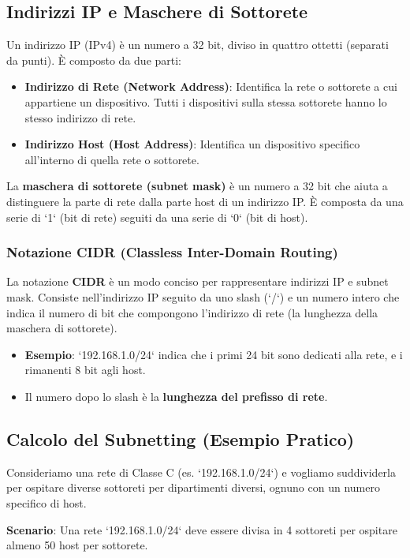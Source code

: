 \subsection{Indirizzi IP e Maschere di Sottorete}
Un indirizzo IP (IPv4) è un numero a 32 bit, diviso in quattro ottetti (separati da punti). È composto da due parti:
\begin{itemize}
    \item \textbf{Indirizzo di Rete (Network Address)}: Identifica la rete o sottorete a cui appartiene un dispositivo. Tutti i dispositivi sulla stessa sottorete hanno lo stesso indirizzo di rete.
    \item \textbf{Indirizzo Host (Host Address)}: Identifica un dispositivo specifico all'interno di quella rete o sottorete.
\end{itemize}
La \textbf{maschera di sottorete (subnet mask)} è un numero a 32 bit che aiuta a distinguere la parte di rete dalla parte host di un indirizzo IP. È composta da una serie di `1` (bit di rete) seguiti da una serie di `0` (bit di host).

\subsubsection{Notazione CIDR (Classless Inter-Domain Routing)}
La notazione \textbf{CIDR} è un modo conciso per rappresentare indirizzi IP e subnet mask. Consiste nell'indirizzo IP seguito da uno slash (`/`) e un numero intero che indica il numero di bit che compongono l'indirizzo di rete (la lunghezza della maschera di sottorete).
\begin{itemize}
    \item \textbf{Esempio}: `192.168.1.0/24` indica che i primi 24 bit sono dedicati alla rete, e i rimanenti 8 bit agli host.
    \item Il numero dopo lo slash è la \textbf{lunghezza del prefisso di rete}.
\end{itemize}

\subsection{Calcolo del Subnetting (Esempio Pratico)}
Consideriamo una rete di Classe C (es. `192.168.1.0/24`) e vogliamo suddividerla per ospitare diverse sottoreti per dipartimenti diversi, ognuno con un numero specifico di host.

\textbf{Scenario}: Una rete `192.168.1.0/24` deve essere divisa in 4 sottoreti per ospitare almeno 50 host per sottorete.


